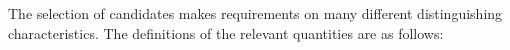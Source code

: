 

The selection of candidates makes requirements on many different distinguishing characteristics. The definitions of the relevant quantities are as follows:  
